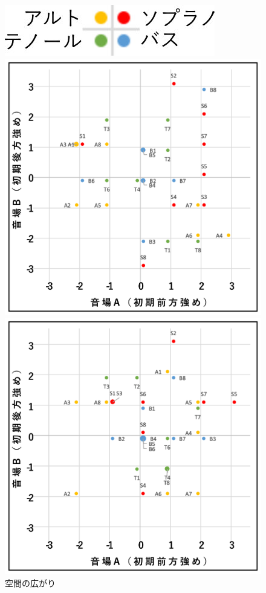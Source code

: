 \documentclass[11pt,a4j]{jreport}
\begin{document}
\begin{figure}[H]
  \begin{minipage}{1\linewidth}
    \centering
    \includegraphics[scale=.7]{images/subjectiveExp/scat_0_legend.jpg}
  \end{minipage}

  \begin{minipage}{0.5\linewidth}
    \centering
    \includegraphics[width=.9\linewidth]{images/subjectiveExp/scat_early_04spacy.png}
    \caption*{空間の広がり}
  \end{minipage}%
  \begin{minipage}{0.5\linewidth}
    \centering
    \includegraphics[width=.9\linewidth]{images/subjectiveExp/scat_early_05audience.png}

\end{minipage}
\end{figure}
\end{document}
